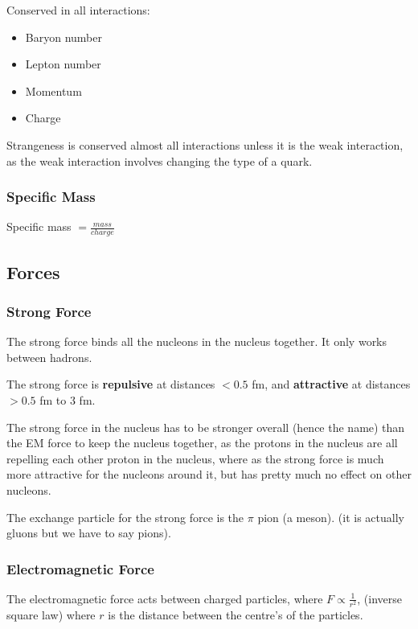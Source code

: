 \documentclass[a4paper, 12pt]{article}
\begin{document}
Conserved in all interactions:
\begin{itemize}
	\item{Baryon number}
	\item{Lepton number}
	\item{Momentum}
	\item{Charge}
\end{itemize}

Strangeness is conserved almost all interactions unless it is the weak interaction, as the weak interaction involves changing the type of a quark.

\subsubsection{Specific Mass}

Specific mass $= \frac{mass}{charge}$

\subsection{Forces}

\subsubsection{Strong Force}

The strong force binds all the nucleons in the nucleus together. It only works between hadrons.

The strong force is {\textbf{repulsive}} at distances $< 0.5$ fm, and {\textbf{attractive}} at distances $> 0.5$ fm to $3$ fm.

The strong force in the nucleus has to be stronger overall (hence the name) than the EM force to keep the nucleus together, as the protons in the nucleus are all repelling each other proton in the nucleus, where as the strong force is much more attractive for the nucleons around it, but has pretty much no effect on other nucleons.

The exchange particle for the strong force is the $\pi$ pion (a meson). (it is actually gluons but we have to say pions).


\subsubsection{Electromagnetic Force}

The electromagnetic force acts between charged particles, where $F \propto \frac{1}{r^2}$, (inverse square law) where $r$ is the distance between the centre's of the particles.
\end{document}

